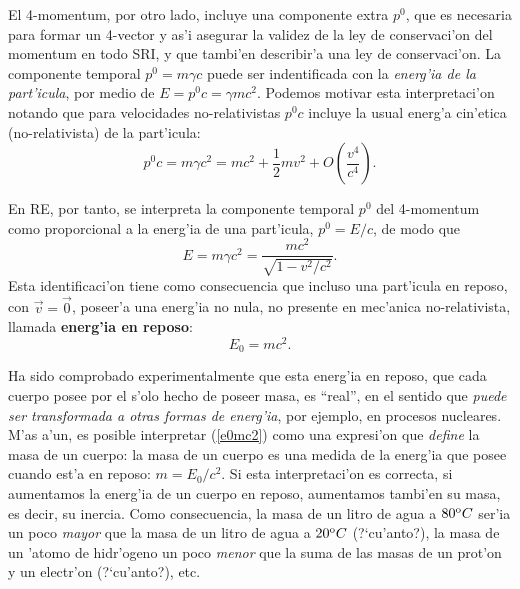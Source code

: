 El 4-momentum, por otro lado, incluye una componente extra $p^0$, que es
necesaria para formar un 4-vector y as'i asegurar la validez de la ley de
conservaci'on del momentum en todo SRI, y que tambi'en describir'a una ley de
conservaci'on. La componente temporal $p^0=m\gamma c$ puede ser indentificada
con la \textit{energ'ia de la part'icula}, por medio de $E=p^0 c=\gamma mc^2$.
Podemos motivar esta interpretaci'on notando que para velocidades
no-relativistas $p^0 c$ incluye la usual energ'a cin'etica (no-relativista) de
la part'icula:
\begin{equation}
p^0c=m\gamma c^2=mc^2+\frac{1}{2}mv^2+O(\frac{v^4}{c^4}).
\end{equation}

En RE, por tanto, se interpreta la componente temporal $p^0$ del 4-momentum como proporcional a la energ'ia de una part'icula, $p^0=E/c$, de modo que
\begin{equation}
 \boxed{E=m\gamma c^2=\frac{mc^2}{\sqrt{1-v^2/c^2}}.} \label{emgc2}
\end{equation}
 Esta identificaci'on tiene como consecuencia que incluso una  part'icula en reposo, con
$\vec{v}=\vec{0}$, poseer'a una energ'ia no nula, no presente en mec'anica
no-relativista, llamada \textbf{energ'ia en reposo}:
\begin{equation}
\boxed{E_0=mc^2.} \label{e0mc2}
\end{equation}

Ha sido comprobado experimentalmente que esta energ'ia en reposo, que cada
cuerpo posee por el s'olo hecho de poseer masa, es ``real'', en el
sentido que \textit{puede ser transformada a otras formas de energ'ia}, por ejemplo, en procesos nucleares. M'as a'un, es posible interpretar (\ref{e0mc2}) como una expresi'on que \textit{define} la masa de un cuerpo: la masa de un cuerpo es una medida de la energ'ia que posee cuando est'a en reposo: $m=E_0/c^2$. Si esta interpretaci'on es correcta, si aumentamos la energ'ia de un cuerpo en reposo, aumentamos tambi'en su masa, es decir, su inercia. Como consecuencia, la masa de un litro de agua a $80^{\rm o} C$ ser'ia un poco \textit{mayor} que la masa de un litro de agua a $20^{\rm o} C$ (?`cu'anto?), la masa de un 'atomo de hidr'ogeno un poco \textit{menor} que la suma de las masas de un prot'on y un electr'on (?`cu'anto?), etc.

